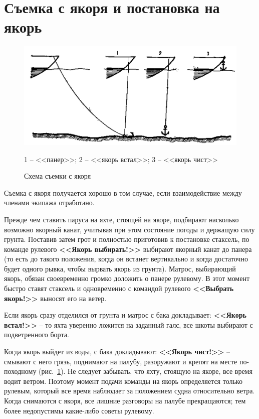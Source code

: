 \documentclass[a4paper, 12pt, twoside, final]{scrbook}
\begin{document}
\section{Съемка с якоря и постановка на якорь}

\begin{figure}[htbp]
   \centering
   \includegraphics{pics/127_S'emka_s_jakorja} %
   \caption{Схема съемки с якоря}
   \label{fig:127}
   \centering\small
   1 \--- <<панер>>; 2 \--- <<якорь встал>>; 3 \--- <<якорь чист>>
\end{figure}

Съемка с якоря получается хорошо в том случае, если взаимодействие между членами экипажа отработано.

Прежде чем ставить паруса на яхте, стоящей на якоре, подбирают насколько возможно якорный канат, учитывая при этом состояние погоды и держащую силу грунта. Поставив затем грот и полностью приготовив к постановке стаксель, по команде рулевого \textbf{<<Якорь выбирать!>>} выбирают якорный канат до панера (то есть до такого положения, когда он встанет вертикально и когда достаточно будет одного рывка, чтобы вырвать якорь из грунта). Матрос, выбирающий якорь, обязан своевременно громко доложить о панере рулевому. В этот момент быстро ставят стаксель и одновременно с командой рулевого \textbf{<<Выбрать якорь!>>} выносят его на ветер.

Если якорь сразу отделился от грунта и матрос с бака докладывает: \textbf{<<Якорь встал!>>} \--- то яхта уверенно ложится на заданный галс, все шкоты выбирают с подветренного борта. 

Когда якорь выйдет из воды, с бака докладывают:\textbf{ <<Якорь чист!>>} \--- смывают с него грязь, поднимают на палубу, разоружают и крепят на месте по-походному (рис.~\ref{fig:127}). Не следует забывать, что яхту, стоящую на якоре, все время водит ветром. Поэтому момент подачи команды на якорь определяется только рулевым, который все время наблюдает за положением судна относительно ветра. Когда снимаются с якоря, все лишние разговоры на палубе прекращаются; тем более недопустимы какие-либо советы рулевому.
\end{document}

